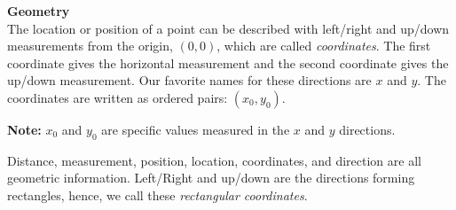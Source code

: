 \documentclass{ximera}
\begin{document}
\textbf{\textcolor{purple!85!blue}{Geometry}} \\

The location or position of a point can be described with left/right and up/down measurements from the origin, $(0,0)$, which are called \textit{coordinates}.  The first coordinate gives the horizontal measurement and the second coordinate gives the up/down measurement.  Our favorite names for these directions are $x$ and $y$. The coordinates are written as ordered pairs: $(x_0, y_0)$.

\textbf{Note:} $x_0$ and $y_0$ are specific values measured in the $x$ and $y$ directions. 


Distance, measurement, position, location, coordinates, and direction are all geometric information.  Left/Right and up/down are the directions forming rectangles, hence, we call these \textit{rectangular coordinates}.













\begin{image}
\end{image}
\end{document}
